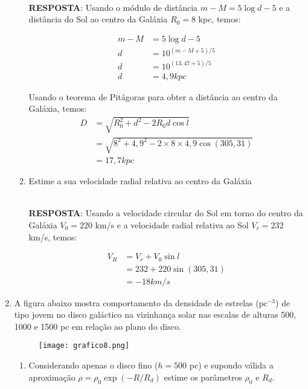 \documentclass[a4paper,12pt]{article}
\begin{document}
\begin{enumerate}
\begin{enumerate}
\noindent\hrulefill\\\textbf{RESPOSTA}: Usando o módulo de distância $m - M = 5 \log d - 5$ e a distância do Sol ao centro da Galáxia $R_0 = 8$ kpc, temos:

\begin{align*}
m - M &= 5 \log d - 5 \\
d &= 10^{(m-M+5)/5} \\
d &= 10^{(13,47+5)/5} \\
d &= 4,9 kpc
\end{align*}

Usando o teorema de Pitágoras para obter a distância ao centro da Galáxia, temos:
\begin{align*}
D &= \sqrt{R_0^2 + d^2 - 2 R_0 d \cos l} \\
&= \sqrt{8^2 + 4,9^2 - 2 \times 8 \times 4,9 \cos (305,31)} \\
&= 17,7 kpc
\end{align*}

\noindent\hrulefill

\item Estime a sua velocidade radial relativa ao centro da Galáxia

\noindent\hrulefill\\\textbf{RESPOSTA}: Usando a velocidade circular do Sol em torno do centro da Galáxia $V_0 = 220$ km/s e a velocidade radial relativa ao Sol $V_r = 232$ km/s, temos:

\begin{align*}
V_R &= V_r + V_0 \sin l \\
&= 232 + 220 \sin (305,31) \\
&= -18 km/s
\end{align*}
\end{enumerate}

\noindent\hrulefill

\item A figura abaixo mostra comportamento da densidade de estrelas ($\mathrm{pc}^{-3}$) de tipo jovem no disco galáctico na vizinhança solar nas escalas de alturas 500, 1000 e 1500 pc em relação ao plano do disco.

\begin{figure}[H]
    \centering
    \texttt{[image: grafico8.png]}
\end{figure}

\begin{enumerate}
\item Considerando apenas o disco fino ($h=500$ pc) e supondo válida a aproximação $\rho=\rho_0 \exp(-R/R_d)$ estime os parâmetros $\rho_0$ e $R_d$.


\end{enumerate}
\end{enumerate}
\end{document}
